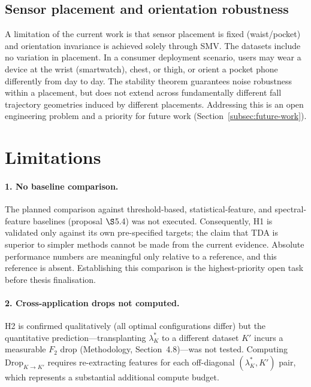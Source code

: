 \subsection{Sensor placement and orientation robustness}

A limitation of the current work is that sensor placement is fixed (waist/pocket) and
orientation invariance is achieved solely through SMV.  The datasets include no
variation in placement.  In a consumer deployment scenario, users may wear a device
at the wrist (smartwatch), chest, or thigh, or orient a pocket phone differently from
day to day.  The stability theorem guarantees noise robustness within a placement, but
does not extend across fundamentally different fall trajectory geometries induced by
different placements.  Addressing this is an open engineering problem and a priority
for future work (Section~\ref{subsec:future-work}).

\section{Limitations}
\label{subsec:limitations}

\paragraph{1. No baseline comparison.}
The planned comparison against threshold-based, statistical-feature, and spectral-feature
baselines (proposal $\S$5.4) was not executed.  Consequently, H1 is validated only
against its own pre-specified targets; the claim that TDA is superior to simpler
methods cannot be made from the current evidence.  Absolute performance numbers are
meaningful only relative to a reference, and this reference is absent.  Establishing
this comparison is the highest-priority open task before thesis finalisation.

\paragraph{2. Cross-application drops not computed.}
H2 is confirmed qualitatively (all optimal configurations differ) but the quantitative
prediction---transplanting $\lambda^*_K$ to a different dataset $K'$ incurs a
measurable $F_2$ drop (Methodology, Section~4.8)---was not tested.  Computing
$\mathrm{Drop}_{K\to K'}$ requires re-extracting features for each off-diagonal
$(\lambda^*_K, K')$ pair, which represents a substantial additional compute budget.

